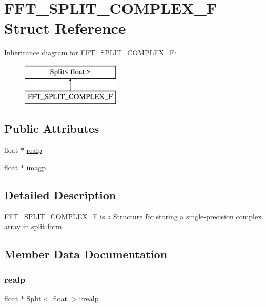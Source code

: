 \hypertarget{struct_float_split}{}\section{F\+F\+T\+\_\+\+S\+P\+L\+I\+T\+\_\+\+C\+O\+M\+P\+L\+E\+X\+\_\+F Struct Reference}
\label{struct_float_split}
Inheritance diagram for F\+F\+T\+\_\+\+S\+P\+L\+I\+T\+\_\+\+C\+O\+M\+P\+L\+E\+X\+\_\+F\+:\begin{figure}[H]
\begin{center}
\leavevmode
\includegraphics[height=2.000000cm]{struct_float_split}
\end{center}
\end{figure}
\subsection*{Public Attributes}
\begin{DoxyCompactItemize}
\item 
float $\ast$ \hyperlink{_h_i_s_s_tools___f_f_t_8h_aaadcedfa082d6f07b33cd89ea4f19814}{realp}
\item 
float $\ast$ \hyperlink{_h_i_s_s_tools___f_f_t_8h_a21ff23a96abee0c0ed6a2433798c4eac}{imagp}
\end{DoxyCompactItemize}


\subsection{Detailed Description}
F\+F\+T\+\_\+\+S\+P\+L\+I\+T\+\_\+\+C\+O\+M\+P\+L\+E\+X\+\_\+F is a Structure for storing a single-\/precision complex array in split form. 

\subsection{Member Data Documentation}
\mbox{\label{_h_i_s_s_tools___f_f_t_8h_aaadcedfa082d6f07b33cd89ea4f19814}} 
\subsubsection{\texorpdfstring{realp}{realp}}
{\footnotesize\ttfamily float $\ast$ \hyperlink{_h_i_s_s_tools___f_f_t_8h_struct_split}{Split}$<$ float  $>$\+::realp\hspace{0.3cm}{\ttfamily [inherited]}}

